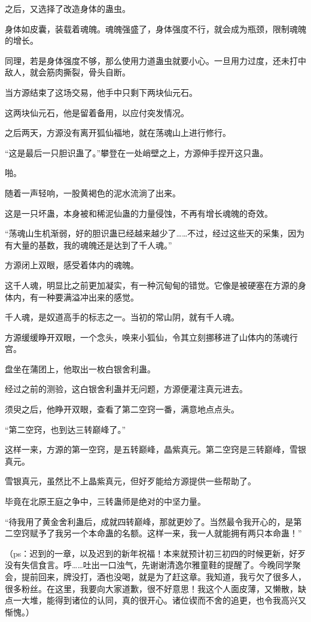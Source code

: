 \begin{this_body}
之后，又选择了改造身体的蛊虫。

身体如皮囊，装载着魂魄。魂魄强盛了，身体强度不行，就会成为瓶颈，限制魂魄的增长。

同理，若是身体强度不够，那么使用力道蛊虫就要小心。一旦用力过度，还未打中敌人，就会筋肉撕裂，骨头自断。

当方源结束了这场交易，他手中只剩下两块仙元石。

这两块仙元石，他是留着备用，以应付突发情况。

之后两天，方源没有离开狐仙福地，就在荡魂山上进行修行。

“这是最后一只胆识蛊了。”攀登在一处峭壁之上，方源伸手捏开这只蛊。

啪。

随着一声轻响，一股黄褐色的泥水流淌了出来。

这是一只坏蛊，本身被和稀泥仙蛊的力量侵蚀，不再有增长魂魄的奇效。

“荡魂山生机渐弱，好的胆识蛊已经越来越少了……不过，经过这些天的采集，因为有大量的基数，我的魂魄还是达到了千人魂。”

方源闭上双眼，感受着体内的魂魄。

这千人魂，明显比之前更加凝实，有一种沉甸甸的错觉。它像是被硬塞在方源的身体内，有一种要满溢冲出来的感觉。

千人魂，是奴道高手的标志之一。当初的常山阴，就有千人魂。

方源缓缓睁开双眼，一个念头，唤来小狐仙，令其立刻挪移进了山体内的荡魂行宫。

盘坐在蒲团上，他取出一枚白银舍利蛊。

经过之前的测验，这白银舍利蛊并无问题，方源便灌注真元进去。

须臾之后，他睁开双眼，查看了第二空窍一番，满意地点点头。

“第二空窍，也到达三转巅峰了。”

这样一来，方源的第一空窍，是五转巅峰，晶紫真元。第二空窍是三转巅峰，雪银真元。

雪银真元，虽然比不上晶紫真元，但好歹能给方源提供一些帮助了。

毕竟在北原王庭之争中，三转蛊师是绝对的中坚力量。

“待我用了黄金舍利蛊后，成就四转巅峰，那就更妙了。当然最令我开心的，是第二空窍赋予了我另一个本命蛊的名额。这样一来，我一人就能拥有两只本命蛊！”

（ps：迟到的一章，以及迟到的新年祝福！本来就预计初三初四的时候更新，好歹没有失信食言。呼……吐出一口浊气，先谢谢清逸尔雅童鞋的提醒了。今晚同学聚会，提前回来，牌没打，酒也没喝，就是为了赶这章。我知道，我亏欠了很多人，很多粉丝。在这里，我要向大家道歉，很不好意思！我这个人面皮薄，又懒散，缺点一大堆，能得到诸位的认同，真的很开心。诸位锲而不舍的追更，也令我高兴又惭愧。）


\end{this_body}

